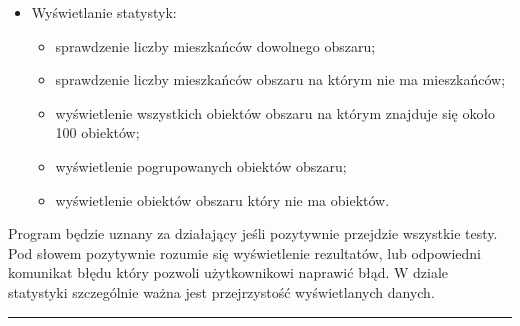\documentclass[a4paper,11pt]{article}
\newcommand{\linia}{\rule{\linewidth}{0.4mm}}
\begin{document}
\begin{itemize}
\item{Wyświetlanie statystyk:}
\begin{itemize}
\item sprawdzenie liczby mieszkańców dowolnego obszaru;
\item sprawdzenie liczby mieszkańców obszaru na którym nie ma mieszkańców;
\item wyświetlenie wszystkich obiektów obszaru na którym znajduje się około 100 obiektów;
\item wyświetlenie pogrupowanych obiektów obszaru;
\item wyświetlenie obiektów obszaru który nie ma obiektów.
\end{itemize}

\end{itemize}
Program będzie uznany za działający jeśli pozytywnie przejdzie wszystkie testy. Pod słowem pozytywnie rozumie się wyświetlenie rezultatów, lub odpowiedni komunikat błędu który pozwoli użytkownikowi naprawić błąd. W dziale statystyki szczególnie ważna jest przejrzystość wyświetlanych danych.

\noindent\linia
\end{document}
